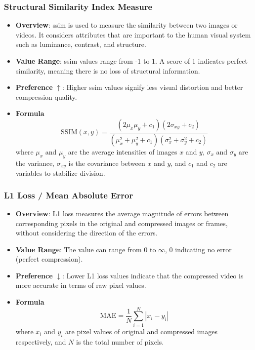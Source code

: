 \documentclass{ioereport}
\begin{document}
        \subsubsection{Structural Similarity Index Measure}
            \begin{itemize}
                \item \textbf{Overview}: \gls{ssim} is used to measure the similarity between two images or videos. It considers attributes that are important to the human visual system such as luminance, contrast, and structure.
                \item \textbf{Value Range}: \gls{ssim} values range from -1 to 1. A score of 1 indicates perfect similarity, meaning there is no loss of structural information.
                \item \textbf{Preference} $\uparrow$: Higher \gls{ssim} values signify less visual distortion and better compression quality.
                \item \textbf{Formula}\\ 
                \begin{equation}\label{eqn:SSIM}
                    \text{SSIM}(x, y) = \frac{(2 \mu_x \mu_y + c_1)(2 \sigma_{xy} + c_2)}{(\mu_x^2 + \mu_y^2 + c_1)(\sigma_x^2 + \sigma_y^2 + c_2)}
                \end{equation}
                where $\mu_x$ and $\mu_y$ are the average intensities of images $x$ and $y$, $\sigma_{x}$ and $\sigma_y$ are the variance, $\sigma_{xy}$ is the covariance between $x$ and $y$, and $c_1$ and $c_2$ are variables to stabilize division.
            \end{itemize}

        
        \subsubsection{L1 Loss / Mean Absolute Error}
            \begin{itemize}
                \item \textbf{Overview}: L1 loss measures the average magnitude of errors between corresponding pixels in the original and compressed images or frames, without considering the direction of the errors.
                \item \textbf{Value Range}: The value can range from 0 to $\infty$,  0 indicating no error (perfect compression).
                \item \textbf{Preference} $\downarrow$: Lower L1 loss values indicate that the compressed video is more accurate in terms of raw pixel values.
                \item \textbf{Formula}\\
                \begin{equation}
                    \text{MAE} = \frac{1}{N} \sum_{i=1}^{N} |x_i - y_i|
                \end{equation}
                where $x_i$ and $y_i$ are pixel values of original and compressed images respectively, and $N$ is the total number of pixels.
            \end{itemize}
\end{document}
